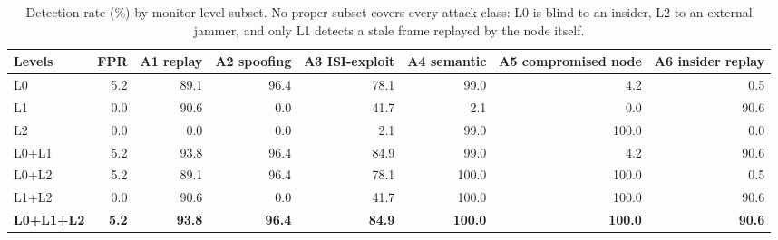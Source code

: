 \begin{table}[t]
\centering
\caption{Detection rate (\%) by monitor level subset. No proper subset covers every attack class: L0 is blind to an insider, L2 to an external jammer, and only L1 detects a stale frame replayed by the node itself.}
\label{tab:ablation}
\begin{tabular}{lrrrrrrr}
\toprule
Levels & FPR & A1 replay & A2 spoofing & A3 ISI-exploit & A4 semantic & A5 compromised node & A6 insider replay \\
\midrule
L0 & 5.2 & 89.1 & 96.4 & 78.1 & 99.0 & 4.2 & 0.5 \\
L1 & 0.0 & 90.6 & 0.0 & 41.7 & 2.1 & 0.0 & 90.6 \\
L2 & 0.0 & 0.0 & 0.0 & 2.1 & 99.0 & 100.0 & 0.0 \\
L0+L1 & 5.2 & 93.8 & 96.4 & 84.9 & 99.0 & 4.2 & 90.6 \\
L0+L2 & 5.2 & 89.1 & 96.4 & 78.1 & 100.0 & 100.0 & 0.5 \\
L1+L2 & 0.0 & 90.6 & 0.0 & 41.7 & 100.0 & 100.0 & 90.6 \\
\textbf{L0+L1+L2} & \textbf{5.2} & \textbf{93.8} & \textbf{96.4} & \textbf{84.9} & \textbf{100.0} & \textbf{100.0} & \textbf{90.6} \\
\bottomrule
\end{tabular}
\end{table}

